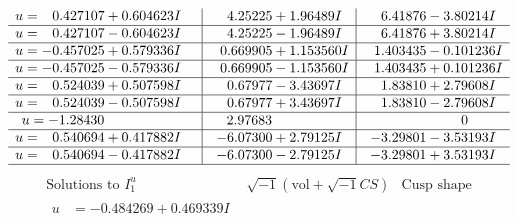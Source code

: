 \documentclass[1p]{elsarticle_modified}
\theoremstyle{definition}
\newcommand{\I}{\sqrt{-1}}
\begin{document}
$$\begin{array}{c|c|c}
\begin{aligned}
u &= \phantom{-}0.427107 + 0.604623 I\end{aligned}
 & \phantom{-}4.25225 + 1.96489 I & \phantom{-}6.41876 - 3.80214 I \\ \hline\begin{aligned}
u &= \phantom{-}0.427107 - 0.604623 I\end{aligned}
 & \phantom{-}4.25225 - 1.96489 I & \phantom{-}6.41876 + 3.80214 I \\ \hline\begin{aligned}
u &= -0.457025 + 0.579336 I\end{aligned}
 & \phantom{-}0.669905 + 1.153560 I & \phantom{-}1.403435 - 0.101236 I \\ \hline\begin{aligned}
u &= -0.457025 - 0.579336 I\end{aligned}
 & \phantom{-}0.669905 - 1.153560 I & \phantom{-}1.403435 + 0.101236 I \\ \hline\begin{aligned}
u &= \phantom{-}0.524039 + 0.507598 I\end{aligned}
 & \phantom{-}0.67977 - 3.43697 I & \phantom{-}1.83810 + 2.79608 I \\ \hline\begin{aligned}
u &= \phantom{-}0.524039 - 0.507598 I\end{aligned}
 & \phantom{-}0.67977 + 3.43697 I & \phantom{-}1.83810 - 2.79608 I \\ \hline\begin{aligned}
u &= -1.28430\phantom{ +0.000000I}\end{aligned}
 & \phantom{-}2.97683\phantom{ +0.000000I} & \phantom{-0.000000 } 0 \\ \hline\begin{aligned}
u &= \phantom{-}0.540694 + 0.417882 I\end{aligned}
 & -6.07300 + 2.79125 I & -3.29801 - 3.53193 I \\ \hline\begin{aligned}
u &= \phantom{-}0.540694 - 0.417882 I\end{aligned}
 & -6.07300 - 2.79125 I & -3.29801 + 3.53193 I\\
 \hline 
 \end{array}$$\newpage$$\begin{array}{c|c|c}  
\text{Solutions to }I^u_{1}& \I (\text{vol} + \sqrt{-1}CS) & \text{Cusp shape}\\
 \hline 
\begin{aligned}
u &= -0.484269 + 0.469339 I\end{aligned}

\end{array}$$
\end{document}
